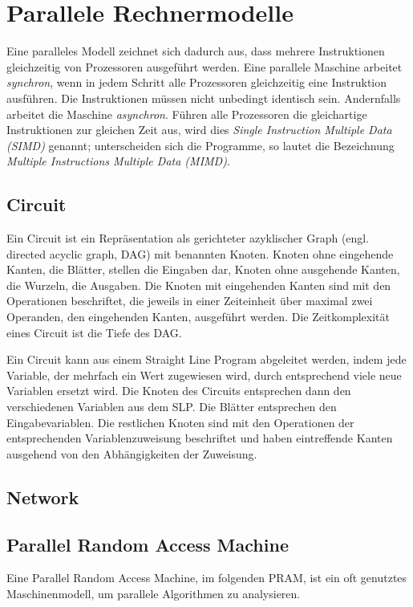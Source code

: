 \section{Parallele Rechnermodelle}
Eine paralleles Modell zeichnet sich dadurch aus, dass mehrere Instruktionen gleichzeitig von Prozessoren ausgeführt werden.
Eine parallele Maschine arbeitet \emph{synchron}, wenn in jedem Schritt alle Prozessoren gleichzeitig eine Instruktion ausführen.
Die Instruktionen müssen nicht unbedingt identisch sein.
Andernfalls arbeitet die Maschine \emph{asynchron}.
Führen alle Prozessoren die gleichartige Instruktionen zur gleichen Zeit aus, wird dies \emph{Single Instruction Multiple Data (SIMD)} genannt; unterscheiden sich die Programme, so lautet die Bezeichnung \emph{Multiple Instructions Multiple Data (MIMD)}.

\subsection{Circuit}
Ein Circuit ist ein Repräsentation als gerichteter azyklischer Graph (engl. directed acyclic graph, DAG) mit benannten Knoten.
Knoten ohne eingehende Kanten, die Blätter, stellen die Eingaben dar, Knoten ohne ausgehende Kanten, die Wurzeln, die Ausgaben.
Die Knoten mit eingehenden Kanten sind mit den Operationen beschriftet, die jeweils in einer Zeiteinheit über maximal zwei Operanden, den eingehenden Kanten, ausgeführt werden.
Die Zeitkomplexität eines Circuit ist die Tiefe des DAG.

Ein Circuit kann aus einem Straight Line Program abgeleitet werden, indem jede Variable, der mehrfach ein Wert zugewiesen wird, durch entsprechend viele neue Variablen ersetzt wird.
Die Knoten des Circuits entsprechen dann den verschiedenen Variablen aus dem SLP.
Die Blätter entsprechen den Eingabevariablen.
Die restlichen Knoten sind mit den Operationen der entsprechenden Variablenzuweisung beschriftet und haben eintreffende Kanten ausgehend von den Abhängigkeiten der Zuweisung.
\cite[S.7]{jaja}\cite[S.11f.]{reif}

\subsection{Network}


\subsection{Parallel Random Access Machine}
Eine Parallel Random Access Machine, im folgenden PRAM, ist ein oft genutztes Maschinenmodell, um parallele Algorithmen zu analysieren.

